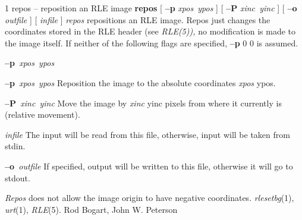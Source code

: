 %
%
%
 1
repos -- reposition an RLE image
{\bf repos}
[
{\bf --p}
{\it xpos\ ypos}
]
[
{\bf --P}
{\it xinc\ yinc}
] [
{\bf --o}
{\it outfile}
] [ 
{\it infile}
] 
{\it repos}
repositions an RLE image.  Repos just changes the coordinates stored in
the RLE header (see
{\it RLE(5)),}
no modification is made to the image itself.
If neither of the following flags are specified,
{\bf --p}
0 0 is assumed.
\begin{TPlist}{{\bf --p}{\it \ xpos\ ypos}
}
\item[{{\bf --p}{\it \ xpos\ ypos}
}]
Reposition the image to the absolute coordinates
{\it xpos} ypos.
\item[{{\bf --P}{\it \ xinc\ yinc}
}]
Move the image by 
{\it xinc} yinc
pixels from where it currently is (relative movement).
\item[{{\it infile}}]
The input will be read from this file, otherwise, input will
be taken from stdin.
\item[{{\bf --o}{\it \ outfile}
}]
If specified, output will be written to this file, otherwise it will
go to stdout.
\end{TPlist}
{\it Repos}
does not allow the image origin to have negative coordinates.
{\it rlesetbg}{\rm (1),}
{\it urt}{\rm (1),}
{\it RLE}{\rm (5).}
Rod Bogart, John W. Peterson
\newpage


